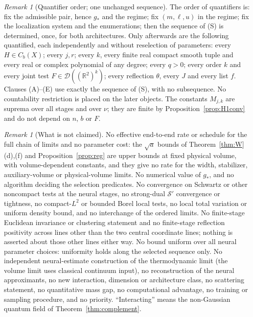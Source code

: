 \documentclass[11pt]{article}
\theoremstyle{plain}
\theoremstyle{definition}
\theoremstyle{remark}
\newtheorem{remark}[theorem]{Remark}
\newcommand{\R}{\mathbb{R}}
\newcommand{\cD}{\mathcal{D}}
\newcommand{\cS}{\mathcal{S}}
\begin{document}
\begin{remark}[Quantifier order; one unchanged sequence]\label{rem:quantifiers}
The order of quantifiers is: fix the admissible pair, hence $g_{*}$ and the
regime; fix $(m,\ell,u)$ in the regime; fix the localization system and the
enumerations; then the sequence of (S) is determined, once, for both
architectures. Only afterwards are the following quantified, each
independently and without reselection of parameters: every $H\in C_b(X)$; every
$j,r$; every $k$, every finite real compact smooth tuple and every real or
complex polynomial of any degree; every $q>0$; every order $k$ and every joint
test $F\in\cD((\R^{2})^{k})$; every reflection $\theta$, every $J$ and every list $f$.
Clauses (A)--(E) use exactly the sequence of (S), with no subsequence. No
countability restriction is placed on the later objects. The constants
$M_{j,k}$ are suprema over all stages and over $\nu$; they are finite by
Proposition~\ref{prop:H1conv} and do not depend on $n$, $b$ or $F$.
\end{remark}

\begin{remark}[What is not claimed]\label{rem:notclaimed}
No effective end-to-end rate or schedule for the full chain of limits and no
parameter cost: the $\sqrt a$ bounds of Theorem~\ref{thm:W}(d),(f) and
Proposition~\ref{prop:reg} are upper bounds at fixed physical volume, with
volume-dependent constants, and they give no rate for the width, stabilizer,
auxiliary-volume or physical-volume limits. No numerical value of $g_{*}$, and
no algorithm deciding the selection predicates. No convergence on Schwartz or
other noncompact tests at the neural stages, no strong-dual $\cS'$ convergence
or tightness, no compact-$L^{2}$ or bounded Borel local tests, no local total
variation or uniform density bound, and no interchange of the ordered limits.
No finite-stage Euclidean invariance or clustering statement and no finite-stage
reflection positivity across lines other than the two central coordinate lines;
nothing is asserted about those other lines either way. No bound uniform over all
neural parameter choices: uniformity holds along the selected sequence only.
No independent neural-estimate construction of the thermodynamic limit (the
volume limit uses classical continuum input), no reconstruction of the neural
approximants, no new interaction, dimension or architecture class, no
scattering statement, no quantitative mass gap, no computational advantage, no
training or sampling procedure, and no priority. ``Interacting'' means the
non-Gaussian quantum field of Theorem~\ref{thm:complement}.
\end{remark}
\end{document}
